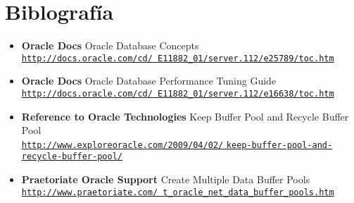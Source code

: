 \section{Biblograf\'ia}


\begin{itemize}
  \item \textbf{Oracle Docs} Oracle Database Concepts \\
    \href{http://docs.oracle.com/cd/E11882_01/server.112/e25789/toc.htm}
    {\small \texttt{http://docs.oracle.com/cd/
    E11882\_01/server.112/e25789/toc.htm}}

  \item \textbf{Oracle Docs} Oracle Database Performance Tuning Guide \\
    \href{http://docs.oracle.com/cd/E11882_01/server.112/e16638/toc.htm}
    {\small \texttt{http://docs.oracle.com/cd/
    E11882\_01/server.112/e16638/toc.htm}}

  \item \textbf{Reference to Oracle Technologies} 
    Keep Buffer Pool and Recycle Buffer Pool \\
    \href{http://www.exploreoracle.com/2009/04/02/keep-buffer-pool-and-recycle-buffer-pool/}
    {\small \texttt{http://www.exploreoracle.com/2009/04/02/}
    \texttt{keep-buffer-pool-and-recycle-buffer-pool/}}

  \item \textbf{Praetoriate Oracle Support} Create Multiple Data Buffer Pools\\
    \href{http://www.praetoriate.com/t_oracle_net_data_buffer_pools.htm}
    {\small \texttt{http://www.praetoriate.com/
    t\_oracle\_net\_data\_buffer\_pools.htm}}
\end{itemize}
